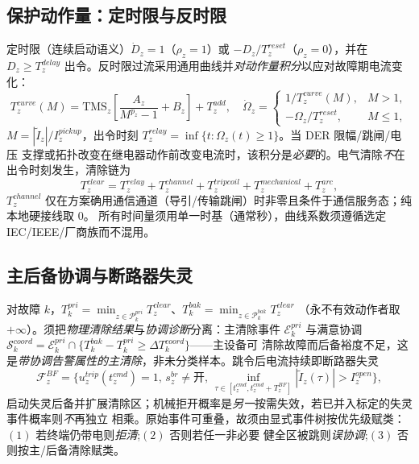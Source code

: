 \subsection{保护动作量：定时限与反时限}\label{sec:rel-pf-relay}
定时限（连续启动语义）$\dot D_z=1$（$\rho_z=1$）或 $-D_z/T_z^{reset}$（$\rho_z=0$），并在 $D_z\ge T_z^{delay}$
出令。反时限过流采用通用曲线并\emph{对动作量积分}以应对故障期电流变化：
\begin{equation}
 T_z^{curve}(M)=\mathrm{TMS}_z\!\left[\frac{A_z}{M^{p_z}-1}+B_z\right]+T_z^{add},\quad
 \dot\Omega_z=\begin{cases}1/T_z^{curve}(M),&M>1,\\ -\Omega_z/T_z^{reset},&M\le1,\end{cases}
\end{equation}
$M=|\widetilde I_z|/I_z^{pickup}$，出令时刻 $T_z^{relay}=\inf\{t:\Omega_z(t)\ge1\}$。当 DER 限幅/跳闸/电压
支撑或拓扑改变在继电器动作前改变电流时，该积分是\emph{必要}的。电气清除\emph{不}在出令时刻发生，清除链为
\begin{equation}
 T_z^{clear}=T_z^{relay}+T_z^{channel}+T_z^{tripcoil}+T_z^{mechanical}+T_z^{arc},
\end{equation}
$T_z^{channel}$ 仅在方案确用通信通道（导引/传输跳闸）时非零且条件于通信服务态；纯本地硬接线取 $0$。
所有时间量须用单一时基（通常秒），曲线系数须遵循选定 IEC/IEEE/厂商族而不混用。

\subsection{主后备协调与断路器失灵}\label{sec:rel-pf-coord}
对故障 $k$，$T_k^{pri}=\min_{z\in\mathcal P_k^{pri}}T_z^{clear}$、$T_k^{bak}=\min_{z\in\mathcal P_k^{bak}}T_z^{clear}$
（永不有效动作者取 $+\infty$）。须把\emph{物理清除结果}与\emph{协调诊断}分离：主清除事件 $\mathcal E_k^{pri}$
与满意协调 $\mathcal S_k^{coord}=\mathcal E_k^{pri}\cap\{T_k^{bak}-T_k^{pri}\ge\Delta T_k^{coord}\}$——主设备可
清除故障而后备裕度不足，这是\emph{带协调告警属性的主清除}，非未分类样本。跳令后电流持续即断路器失灵
\begin{equation}
 \mathcal F_z^{BF}=\big\{u_z^{trip}(t_z^{cmd}){=}1,\,s_z^{br}\ne\text{开},\,\inf_{\tau\in[t_z^{cmd},t_z^{cmd}+T_z^{BF}]}|\widetilde I_z(\tau)|>I_z^{open}\big\},
\end{equation}
启动失灵后备并扩展清除区；机械拒开概率是\emph{另一}按需失效，若已并入标定的失灵事件概率则\emph{不}再独立
相乘。原始事件可重叠，故须由显式事件树按优先级赋类：$(1)$ 若终端仍带电则\emph{拒清};$(2)$ 否则若任一非必要
健全区被跳则\emph{误协调};$(3)$ 否则按主/后备清除赋类。

